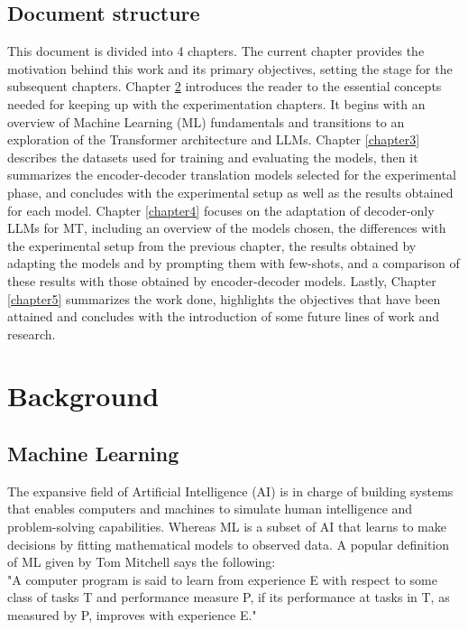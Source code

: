 \documentclass[11pt,english,listoffigures,listoftables]{tfgetsinf}
\begin{document}
\section{Document structure}

This document is divided into 4 chapters. The current chapter provides the motivation behind this work and its primary objectives, setting the stage for the subsequent chapters. Chapter \ref{chapter2} introduces the reader to the essential concepts needed for keeping up with the experimentation chapters. It begins with an overview of Machine Learning (ML) fundamentals and transitions to an exploration of the Transformer architecture and LLMs. Chapter \ref{chapter3} describes the datasets used for training and evaluating the models, then it summarizes the encoder-decoder translation models selected for the experimental phase, and concludes with the experimental setup as well as the results obtained for each model. Chapter \ref{chapter4} focuses on the adaptation of decoder-only LLMs for MT, including an overview of the models chosen, the differences with the experimental setup from the previous chapter, the results obtained by adapting the models and by prompting them with few-shots, and a comparison of these results with those obtained by encoder-decoder models. Lastly, Chapter \ref{chapter5} summarizes the work done, highlights the objectives that have been attained and concludes with the introduction of some future lines of work and research.

\chapter{Background}
\label{chapter2}

\section{Machine Learning}

The expansive field of Artificial Intelligence (AI) is in charge of building systems that enables computers and machines to simulate human intelligence and problem-solving capabilities. Whereas ML is a subset of AI that learns to make decisions by fitting mathematical models to observed data. A popular definition of ML given by Tom Mitchell \cite{mitchellML} says the following:\\
"A computer program is said to learn from experience E with respect to some class of tasks T and performance measure P, if its performance at tasks in T, as measured by P, improves with experience E."
\end{document}
